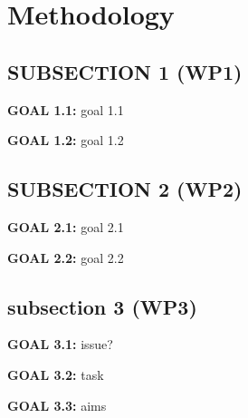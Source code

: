  \lipsum[3]

\section{Methodology}

\subsection{SUBSECTION 1 (WP1)}
\label{sec:wp1}


\begin{mdframed}
\begin{item}
\vspace{-0.3in}
\item[\ding{111}] {\bf GOAL 1.1:} goal 1.1

\item[\ding{111}] {\bf GOAL 1.2:} goal 1.2
\end{item}
\end{mdframed}
\lipsum[1]

\subsection{SUBSECTION 2 (WP2)}
\label{sec:wp2}

\begin{mdframed}
\begin{item}
\vspace{-0.3in}
\item[\ding{111}] {\bf GOAL 2.1:} goal 2.1

\item[\ding{111}] {\bf GOAL 2.2:} goal 2.2
\end{item}
\end{mdframed}

\lipsum[1]


\begin{figure}[!h]
\centering
\caption{}
\label{fig:wp2}
\end{figure}

\lipsum[1]




\subsection{subsection 3 (WP3)}
\label{sec:wp3}


\begin{mdframed}
\begin{item}
\vspace{-0.3in}
\item[\ding{111}] {\bf GOAL 3.1:} issue?

\item[\ding{111}] {\bf GOAL 3.2:} task

\item[\ding{111}] {\bf GOAL 3.3:} aims

\end{item}
\end{mdframed}

